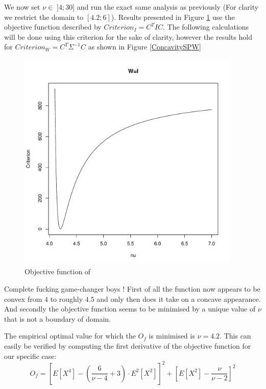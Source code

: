 We now set $\nu \in \; ]4;30]$ and run the exact same analysis as previously (For clarity we restrict the domain to $[4.2;6]$). Results presented in Figure \ref{ConcavitySPI} use the objective function described by $Criterion_I = C^T I C$. The following calculations will be done using this criterion for the sake of clarity, however the results hold for $Criterion_W = C^T \Sigma^{-1} C$ as shown in Figure \ref{ConcavitySPW} \bigskip
\begin{figure}
    \centering
    \includegraphics[width=0.95\textwidth]{ConcavityS&PI.pdf}
    \caption{Objective function of }
    \label{ConcavitySPI}
\end{figure}
\par
Complete fucking game-changer boys ! First of all the function now appears to be convex from $4$ to roughly $4.5$ and only then does it take on a concave appearance. And secondly the objective function seems to be minimised by a unique value of $\nu$ that is not a boundary of domain.
\par
The empirical optimal value for which the $O_f$ is minimised is $\nu=4.2$. 
This can easily be verified by computing the first derivative of the objective function for our specific case:
\begin{equation}\label{ObjectiveFunction_I}
    O_f = \left[E\left[X^4\right] - \left(\frac{6}{\nu-4}+3\right)\cdot         
                E^2\left[X^2\right]\right]^2 +
            \left[E\left[X^2\right] - \frac{\nu}{\nu - 2}\right]^2
\end{equation}

